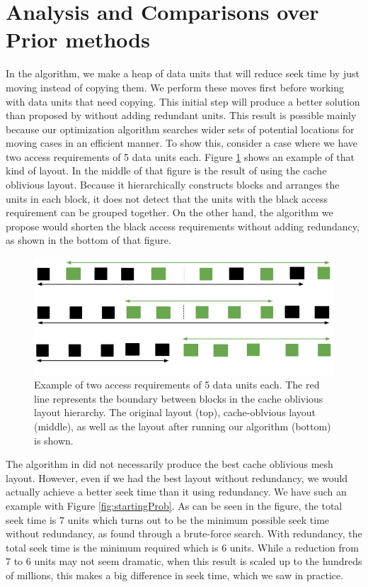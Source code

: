 
\section{Analysis and Comparisons over Prior methods}

In the algorithm, we make a heap of data units that will reduce seek time by
just moving instead of copying them. We perform these moves first before
working with data units that need copying. This initial step will produce a
better solution than proposed by \cite{cacheobliviouslayout} without adding
redundant units. This result is possible mainly because our optimization
algorithm searches wider sets of potential locations for moving cases in an
efficient manner.
To show this, consider a case where we have two
access requirements of 5 data units each. Figure \ref{YoonImprovement} shows an
example of that kind of layout. In the middle of that figure is the result of
using the cache oblivious layout. Because it hierarchically constructs blocks
and arranges the units in each block, it does
not detect that the
units with the black access requirement can be grouped together. On the other
hand, the algorithm we propose would shorten the black access requirements
without adding redundancy, as shown in the bottom of that figure.

\begin{figure}[ht]
\centering
\includegraphics[width=\columnwidth]{ImprovementOverYoon.jpg}
\caption{Example of two access requirements of 5 data units each. The red line represents the boundary between blocks in the cache oblivious layout hierarchy. The original layout (top), cache-oblvious layout (middle), as well as the layout after running our algorithm (bottom) is shown.}
\label{YoonImprovement}
\end{figure}

The algorithm in \cite{cacheobliviouslayout} did not necessarily produce the best cache oblivious mesh layout. However, even if we had the best layout without redundancy, we would actually achieve a better seek time than it using redundancy. We have such an example with Figure \ref{fig:startingProb}. As can be seen in the figure, the total seek time is 7 units which turns out to be the minimum possible seek time without redundancy, as found through a brute-force search. With redundancy, the total seek time is the minimum required which is 6 units. While a reduction from 7 to 6 units may not seem dramatic, when this result is scaled up to the hundreds of millions, this makes a big difference in seek time, which we saw in practice.\\

